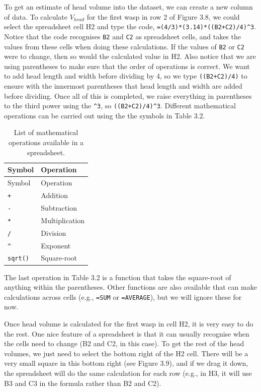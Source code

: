 \documentclass[
]{scrbook}
\begin{document}
To get an estimate of head volume into the dataset, we can create a new column of data.
To calculate \(V_{head}\) for the first wasp in row 2 of Figure 3.8, we could select the spreadsheet cell H2 and type the code, \texttt{=(4/3)*(3.14)*((B2+C2)/4)\^{}3}.
Notice that the code recognises \texttt{B2} and \texttt{C2} as spreadsheet cells, and takes the values from these cells when doing these calculations.
If the values of \texttt{B2} or \texttt{C2} were to change, then so would the calculated value in H2.
Also notice that we are using parentheses to make sure that the order of operations is correct.
We want to add head length and width before dividing by 4, so we type \texttt{((B2+C2)/4)} to ensure with the innermost parentheses that head length and width are added before dividing.
Once all of this is completed, we raise everything in parentheses to the third power using the \texttt{\^{}3}, so \texttt{((B2+C2)/4)\^{}3}.
Different mathematical operations can be carried out using the the symbols in Table 3.2.

\begin{longtable}[]{@{}ll@{}}
\caption{List of mathematical operations available in a spreadsheet.}\tabularnewline
\toprule
Symbol & Operation \\
\midrule
\endfirsthead
\toprule
Symbol & Operation \\
\midrule
\endhead
\texttt{+} & Addition \\
\texttt{-} & Subtraction \\
\texttt{*} & Multiplication \\
\texttt{/} & Division \\
\texttt{\^{}} & Exponent \\
\texttt{sqrt()} & Square-root \\
\bottomrule
\end{longtable}

The last operation in Table 3.2 is a function that takes the square-root of anything within the parentheses.
Other functions are also available that can make calculations across cells (e.g., \texttt{=SUM} or \texttt{=AVERAGE}), but we will ignore these for now.

Once head volume is calculated for the first wasp in cell H2, it is very easy to do the rest.
One nice feature of a spreadsheet is that it can usually recognise when the cells need to change (B2 and C2, in this case).
To get the rest of the head volumes, we just need to select the bottom right of the H2 cell.
There will be a very small square in this bottom right (see Figure 3.9), and if we drag it down, the spreadsheet will do the same calculation for each row (e.g., in H3, it will use B3 and C3 in the formula rather than B2 and C2).
\end{document}
